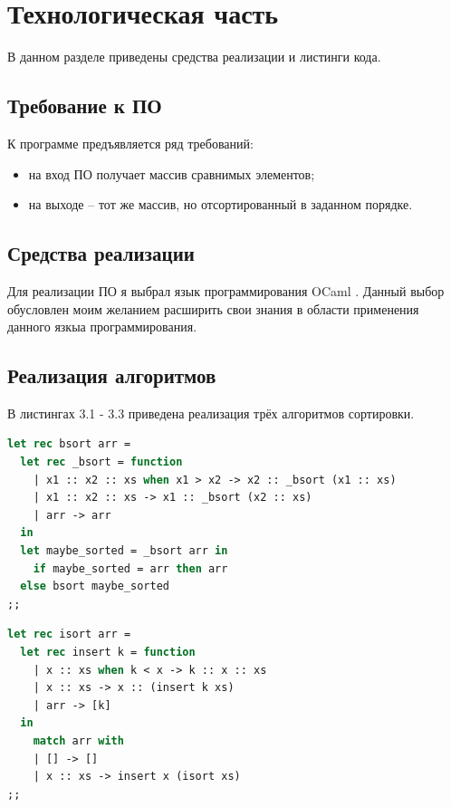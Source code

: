 \documentclass[12pt]{report}
\begin{document}
\chapter{Технологическая часть}

В данном разделе приведены средства реализации и листинги кода.

\section{Требование к ПО}

К программе предъявляется ряд требований:

\begin{itemize}
	\item на вход ПО получает массив сравнимых элементов;
	\item на выходе -- тот же массив, но отсортированный в заданном порядке.
\end{itemize}

\section{Средства реализации}
Для реализации ПО я выбрал язык программирования OCaml \cite{Ocaml}. Данный выбор обусловлен моим желанием расширить свои знания в области применения данного язкыа программирования. 

\section{Реализация алгоритмов}

В листингах 3.1 - 3.3 приведена реализация трёх алгоритмов сортировки.

\begin{lstlisting}[label=some-code,caption=Функция сортировки массива пузырьком, language=Caml]
let rec bsort arr =
  let rec _bsort = function
    | x1 :: x2 :: xs when x1 > x2 -> x2 :: _bsort (x1 :: xs)
    | x1 :: x2 :: xs -> x1 :: _bsort (x2 :: xs)
    | arr -> arr
  in
  let maybe_sorted = _bsort arr in
    if maybe_sorted = arr then arr
  else bsort maybe_sorted
;;
\end{lstlisting}

\begin{lstlisting}[label=some-code,caption=Функция сортировки массива вставками,language=Caml]
let rec isort arr =
  let rec insert k = function
    | x :: xs when k < x -> k :: x :: xs
    | x :: xs -> x :: (insert k xs)
    | arr -> [k]
  in
    match arr with
    | [] -> []
    | x :: xs -> insert x (isort xs)
;;
\end{lstlisting}
\end{document}
